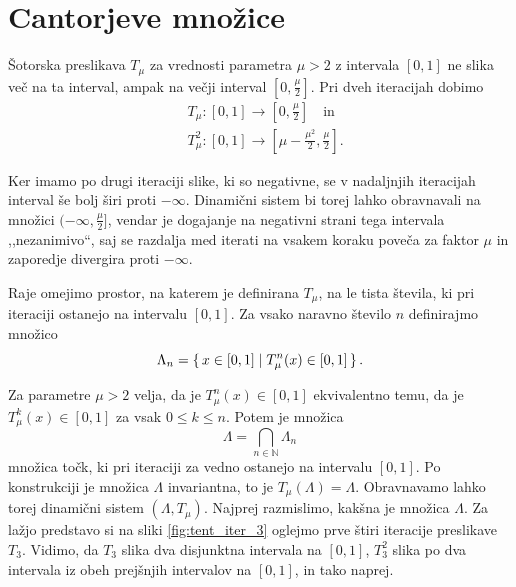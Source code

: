 \documentclass{isrmdelo}
\newcommand{\N}{\mathbb N}
\newcommand{\narekovaji}[1]{,,#1``}
\begin{document}
\section{Cantorjeve množice}

Šotorska preslikava $T_\mu$ za vrednosti parametra $\mu > 2$ z intervala $[0,1]$ ne slika več na ta interval, ampak na večji interval $[0, \frac{\mu}{2}]$. Pri dveh iteracijah dobimo
\begin{align*}
    &T_\mu : [0,1] \longrightarrow [0, \frac{\mu}{2}] \quad \text{in} \\
    &T^2_\mu : [0, 1] \longrightarrow [\mu - \frac{\mu^2}{2}, \frac{\mu}{2}].
\end{align*}

Ker imamo po drugi iteraciji slike, ki so negativne, se v nadaljnjih iteracijah interval še bolj širi proti $-\infty$. Dinamični sistem bi torej lahko obravnavali na množici $(-\infty, \frac{\mu}{2}]$, vendar je dogajanje na negativni strani tega intervala \narekovaji{nezanimivo}, saj se razdalja med iterati na vsakem koraku poveča za faktor $\mu$ in zaporedje divergira proti $-\infty$. 

Raje omejimo prostor, na katerem je definirana $T_\mu$, na le tista števila, ki pri iteraciji ostanejo na intervalu $[0,1]$. Za vsako naravno število $n$ definirajmo množico
\begin{equation*}
    \Lambda_n = \set{ x \in [0,1] \mid T_\mu^n(x) \in [0,1] }.
\end{equation*}

\medskip

Za parametre $\mu > 2$ velja, da je $T_\mu^n(x) \in [0,1]$ ekvivalentno temu, da je $T_\mu^k(x) \in [0,1]$ za vsak $0 \leq k \leq n$. Potem je množica $$ \Lambda = \bigcap_{n \in \N} \Lambda_n $$ množica točk, ki pri iteraciji za vedno ostanejo na intervalu $[0,1]$. Po konstrukciji je množica $\Lambda$ invariantna, to je $T_\mu(\Lambda) = \Lambda$. Obravnavamo lahko torej dinamični sistem $(\Lambda, T_\mu)$. Najprej razmislimo, kakšna je množica $\Lambda$. Za lažjo predstavo si na sliki \ref{fig:tent_iter_3} oglejmo prve štiri iteracije preslikave $T_3$. Vidimo, da $T_3$ slika dva disjunktna intervala na $[0,1]$, $T_3^2$ slika po dva intervala iz obeh prejšnjih intervalov na $[0,1]$, in tako naprej.
\end{document}
